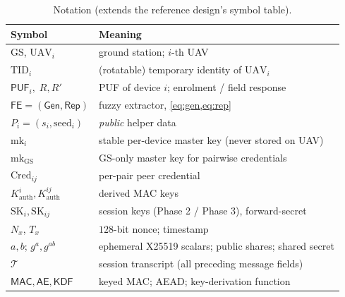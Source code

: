 \documentclass[11pt]{article}
\theoremstyle{plain}
\theoremstyle{definition}
\newcommand{\GS}{\mathrm{GS}}
\newcommand{\UAV}{\mathrm{UAV}}
\newcommand{\PUF}{\mathsf{PUF}}
\newcommand{\TID}{\mathrm{TID}}
\newcommand{\Cred}{\mathrm{Cred}}
\newcommand{\mk}{\mathrm{mk}}
\newcommand{\SK}{\mathrm{SK}}
\newcommand{\MAC}{\mathsf{MAC}}
\newcommand{\aead}{\mathsf{AE}}
\newcommand{\KDF}{\mathsf{KDF}}
\newcommand{\Gen}{\mathsf{Gen}}
\newcommand{\Rep}{\mathsf{Rep}}
\newcommand{\FE}{\mathsf{FE}}
\newcommand{\transcript}{\mathcal{T}}
\begin{document}
\begin{table}[t]
\centering
\caption{Notation (extends the reference design's symbol table).}
\label{tab:notation}
\small
\begin{tabularx}{\linewidth}{@{}l X@{}}
\toprule
\textbf{Symbol} & \textbf{Meaning}\\
\midrule
$\GS$, $\UAV_i$ & ground station; $i$-th UAV\\
$\TID_i$ & (rotatable) temporary identity of $\UAV_i$\\
$\PUF_i,\;R,R'$ & PUF of device $i$; enrolment / field response\\
$\FE=(\Gen,\Rep)$ & fuzzy extractor, \cref{eq:gen,eq:rep}\\
$P_i=(s_i,\text{seed}_i)$ & \emph{public} helper data\\
$\mk_i$ & stable per-device master key (never stored on UAV)\\
$\mk_{\GS}$ & GS-only master key for pairwise credentials\\
$\Cred_{ij}$ & per-pair peer credential\\
$K^{i}_{\mathrm{auth}},K^{ij}_{\mathrm{auth}}$ & derived MAC keys\\
$\SK_i,\SK_{ij}$ & session keys (Phase 2 / Phase 3), forward-secret\\
$N_x$, $T_x$ & $128$-bit nonce; timestamp\\
$a,b$; $g^{a},g^{ab}$ & ephemeral X25519 scalars; public shares; shared secret\\
$\transcript$ & session transcript (all preceding message fields)\\
$\MAC,\aead,\KDF$ & keyed MAC; AEAD; key-derivation function\\
\bottomrule
\end{tabularx}
\end{table}

\end{document}
